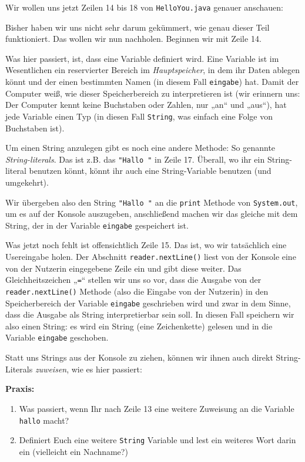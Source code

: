 
Wir wollen uns jetzt Zeilen 14 bis 18 von \texttt{HelloYou.java} genauer
anschauen:


Bisher haben wir uns nicht sehr darum gekümmert, wie genau dieser Teil
funktioniert. Das wollen wir nun nachholen. Beginnen wir mit Zeile 14.

Was hier passiert, ist, dass eine Variable definiert wird. Eine Variable ist im
Wesentlichen ein reservierter Bereich im \emph{Hauptspeicher}, in dem ihr Daten
ablegen könnt und der einen bestimmten Namen (in diesem Fall \texttt{eingabe})
hat. Damit der Computer weiß, wie dieser Speicherbereich zu interpretieren ist
(wir erinnern uns: Der Computer kennt keine Buchstaben oder Zahlen, nur „an“ und
„aus“), hat jede Variable einen Typ (in diesen Fall \texttt{String}, was einfach
eine Folge von Buchstaben ist).

Um einen String anzulegen gibt es noch eine andere Methode: So genannte
\emph{String-literals}. Das ist z.B. das \verb|"Hallo "| in Zeile 17.
Überall, wo ihr ein String-literal benutzen könnt, könnt ihr auch eine
String-Variable benutzen (und umgekehrt).

Wir übergeben also den String \verb|"Hallo "| an die \texttt{print} Methode
von \texttt{System.out}, um es auf der Konsole auszugeben, anschließend machen
wir das gleiche mit dem String, der in der Variable \texttt{eingabe} gespeichert
ist.

Was jetzt noch fehlt ist offensichtlich Zeile 15. Das ist, wo wir tatsächlich
eine Usereingabe holen. Der Abschnitt \texttt{reader.nextLine()} liest von der
Konsole eine von der Nutzerin eingegebene Zeile ein und gibt diese weiter. Das
Gleichheitszeichen „\verb|=|“ stellen wir uns so vor, dass die Ausgabe von
der \texttt{reader.nextLine()} Methode (also die Eingabe von der Nutzerin) in
den Speicherbereich der Variable \texttt{eingabe} geschrieben wird und zwar in
dem Sinne, dass die Ausgabe als String interpretierbar sein soll. In diesen Fall
speichern wir also einen String: es wird ein String (eine Zeichenkette) gelesen
und in die Variable \texttt{eingabe} geschoben.

Statt uns Strings aus der Konsole zu ziehen, können wir ihnen auch direkt
String-Literals \emph{zuweisen}, wie es hier passiert:


\textbf{Praxis:}
\begin{enumerate}
\item Was passiert, wenn Ihr nach Zeile 13 eine weitere Zuweisung an
  die Variable \texttt{hallo} macht?
\item Definiert Euch eine weitere \texttt{String} Variable und lest ein
  weiteres Wort darin ein (vielleicht ein Nachname?)
\end{enumerate}

